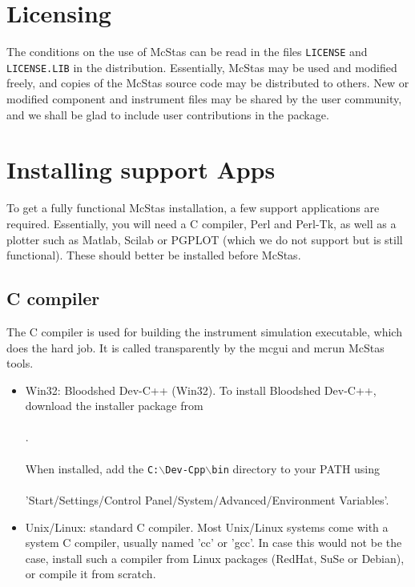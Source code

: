 \label{s:install}
\section{Licensing}
The conditions on the use of McStas can be read in the files
\verb+LICENSE+ and \verb+LICENSE.LIB+ in the distribution. Essentially,
McStas may be used and modified freely, and copies of the McStas source code 
may be distributed to others. 
New or modified component and instrument files may be shared by 
the user community, and we shall be glad to include user contributions in the package.

\section{Installing support Apps}

To get a fully functional McStas installation, a few support applications are required. Essentially, you will need a C compiler, Perl and Perl-Tk, as well as a plotter such as Matlab, Scilab or PGPLOT (which we do not support but is still functional). These should better be installed before McStas.

\subsection{C compiler}
\label{s:Ccompiler}

The C compiler is used for building the instrument simulation executable, which does the hard job. It is called transparently by the mcgui and mcrun McStas tools.

\begin{itemize}
\item{Win32: Bloodshed Dev-C++ (Win32).
  \label{s:instblood}
  To install Bloodshed Dev-C++, download the installer package from
  \\\
  \\.\\\
  \\
  When installed, add the \texttt{C:$\backslash$Dev-Cpp$\backslash$bin} directory to your PATH
  using\\\ \\
  'Start/Settings/Control Panel/System/Advanced/Environment Variables'.
}
\item{Unix/Linux: standard C compiler.
  Most Unix/Linux systems come with a system C compiler, usually named 'cc' or 'gcc'. In case this would not be the case, install such a compiler from Linux packages (RedHat, SuSe or Debian), or compile it from scratch. 
}
\end{itemize}

